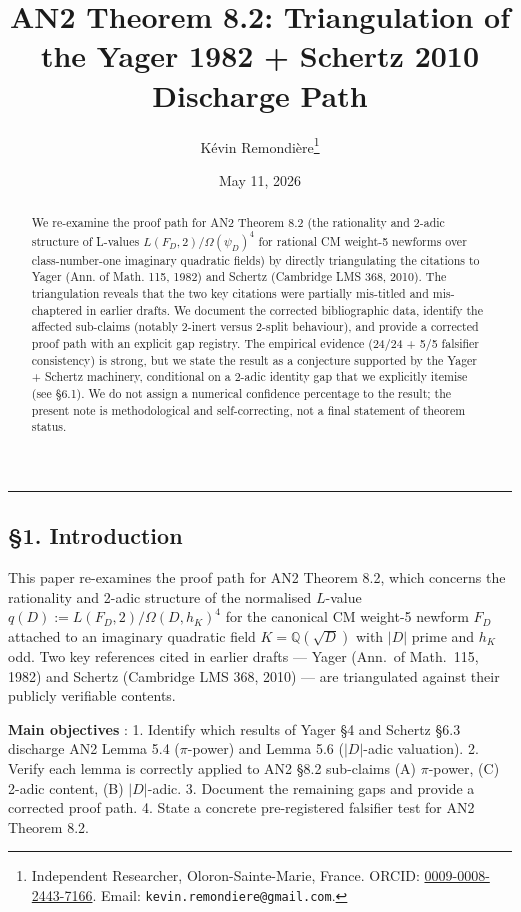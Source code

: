 \documentclass[
  11pt,
  a4paper,
]{article}
\title{AN2 Theorem 8.2: Triangulation of the Yager 1982 + Schertz 2010 Discharge Path}
\author{Kévin Remondière\thanks{Independent Researcher, Oloron-Sainte-Marie, France. ORCID: \href{https://orcid.org/0009-0008-2443-7166}{0009-0008-2443-7166}. Email: \texttt{kevin.remondiere@gmail.com}.}}
\date{May 11, 2026}
\begin{document}
\maketitle

\begin{abstract}
We re-examine the proof path for AN2 Theorem 8.2 (the rationality and 2-adic structure of L-values $L(F_D, 2) / \Omega(\psi_D)^4$ for rational CM weight-5 newforms over class-number-one imaginary quadratic fields) by directly triangulating the citations to Yager (Ann. of Math. 115, 1982) and Schertz (Cambridge LMS 368, 2010). The triangulation reveals that the two key citations were partially mis-titled and mis-chaptered in earlier drafts. We document the corrected bibliographic data, identify the affected sub-claims (notably 2-inert versus 2-split behaviour), and provide a corrected proof path with an explicit gap registry. The empirical evidence (24/24 + 5/5 falsifier consistency) is strong, but we state the result as a conjecture supported by the Yager + Schertz machinery, conditional on a 2-adic identity gap that we explicitly itemise (see \S6.1). We do not assign a numerical confidence percentage to the result; the present note is methodological and self-correcting, not a final statement of theorem status.
\end{abstract}

\begin{center}\rule{0.5\linewidth}{0.5pt}\end{center}

\hypertarget{introduction}{%
\subsection{§1. Introduction}\label{introduction}}

This paper re-examines the proof path for AN2 Theorem 8.2, which concerns the rationality and 2-adic structure of the normalised $L$-value $q(D) := L(F_D, 2)/\Omega(D, h_K)^4$ for the canonical CM weight-5 newform $F_D$ attached to an imaginary quadratic field $K = \mathbb{Q}(\sqrt{D})$ with $|D|$ prime and $h_K$ odd. Two key references cited in earlier drafts --- Yager (Ann.\ of Math.\ 115, 1982) and Schertz (Cambridge LMS 368, 2010) --- are triangulated against their publicly verifiable contents.

\textbf{Main objectives} :
1. Identify which results of Yager \S4 and Schertz \S6.3 discharge AN2 Lemma 5.4 ($\pi$-power) and Lemma 5.6 ($|D|$-adic valuation).
2. Verify each lemma is correctly applied to AN2 \S8.2 sub-claims (A) $\pi$-power, (C) 2-adic content, (B) $|D|$-adic.
3. Document the remaining gaps and provide a corrected proof path.
4. State a concrete pre-registered falsifier test for AN2 Theorem 8.2.
\end{document}
